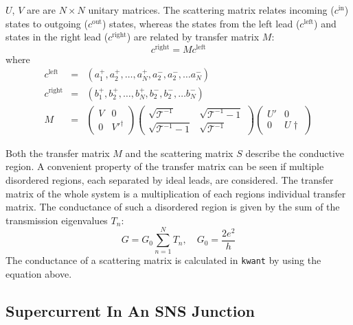 $U$, $V$ are are $N\times N $ unitary matrices.
The scattering matrix relates incoming ($c^\text{in}$) states to outgoing ($c^\text{out}$) states, whereas the states from the left lead ($c^\text{left}$) and states in the right lead ($c^\text{right}$) are related by transfer matrix $M$:
\begin{equation}
c^\text{right} = M c^\text{left}
\end{equation}
where 
\begin{eqnarray}
c^\text{left} &=& \left( a_1^+, a_2^+, \dots, a_N^+, a_2^-, a_2^-, \dots a_N^-\right) \\
c^\text{right} &=& \left( b_1^+, b_2^+, \dots, b_N^+, b_2^-, b_2^-, \dots b_N^-\right) \\
M &=& \begin{pmatrix} V & 0 \\ 0 & V'^\dagger \end{pmatrix} \begin{pmatrix} \sqrt{\mathcal{T}^{-1}} & \sqrt{\mathcal{T}^{-1} -1} \\ \sqrt{\mathcal{T}^{-1} -1} & \sqrt{\mathcal{T}^{-1}}\end{pmatrix} \begin{pmatrix} U' & 0 \\ 0 & U\dagger \end{pmatrix}
\end{eqnarray}

Both the transfer matrix $M$ and the scattering matrix $S$ describe the conductive region. A convenient property of the transfer matrix can be seen if multiple disordered regions, each separated by ideal leads, are considered. The transfer matrix of the whole system is a multiplication of each regions individual transfer matrix.
The conductance of such a disordered region is given by the sum of the transmission eigenvalues $T_n$:
\begin{equation}
G = G_0 \sum_{n=1}^N T_n, \quad G_0 = \frac{2e^2}{h}
\end{equation}
The conductance of a scattering matrix is calculated in \texttt{kwant} by using the equation above.

\subsection{Supercurrent In An SNS Junction}\label{sec:scattering-supercurrent}

